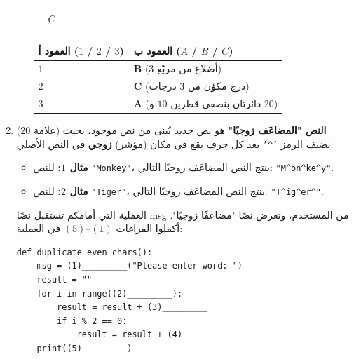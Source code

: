 \documentclass[14pt]{extarticle}
\begin{document}
\begin{enumerate}[resume, label=\textbf{السؤال \arabic*:}, wide=0pt, itemsep=2.2em]
\begin{enumerate}[label=\alph*.]
{\begin{longtable}{|C{0.9cm}|p{7.2cm}|C{0.9cm}|C{5.2cm}|}
\begin{pycell}
\begin{english}
\begin{verbatim}
\end{verbatim}
\end{english}
\end{pycell}
& $C$ &
\begin{english}
\vspace{0.1cm}
\end{english}
\\ \hline
\end{longtable}}

{\renewcommand{\arraystretch}{1.3}
\begin{longtable}{|C{4.5cm}|C{4.5cm}|}
\hline
\textbf{العمود أ ($1$ / $2$ / $3$)} & \textbf{العمود ب ($A$ / $B$ / $C$)} \\
\hline
$1$ & \ifwithsols $\mathbf{B}$ ($3$ أضلاع من مربّع) \fi \\ \hline
$2$ & \ifwithsols $\mathbf{C}$ (درج مكوّن من $3$ درجات) \fi \\ \hline
$3$ & \ifwithsols $\mathbf{A}$ (دائرتان بنصفي قطرين $10$ و $20$) \fi \\ \hline
\end{longtable}}
\filbreak
\end{enumerate}
\filbreak

\item ($20$ علامة) \textbf{النص "المضاعَف زوجيًا"} هو نص جديد يُبنى من نص موجود، بحيث نضيف الرمز \textenglish{\texttt{'\^{}'}} بعد كل حرف يقع في مكان (مؤشر) \textbf{زوجي} في النص الأصلي.
\begin{itemize}
\item \textbf{مثال $1$:} للنص \textenglish{\texttt{"Monkey"}}، ينتج النص المضاعَف زوجيًا التالي: \textenglish{\texttt{"M\^{}on\^{}ke\^{}y"}}.
\item \textbf{مثال $2$:} للنص \textenglish{\texttt{"Tiger"}}، ينتج النص المضاعَف زوجيًا التالي: \textenglish{\texttt{"T\^{}ig\^{}er\^{}"}}.
\end{itemize}
العملية التي أمامكم تستقبل نصًا \textenglish{msg} من المستخدم، وتعرض نصًا "مضاعفًا زوجيًا". أكملوا الفراغات $(1)$–$(5)$ في العملية:

\begin{boxCode}
\begin{english}
\begin{verbatim}
def duplicate_even_chars():
    msg = (1)_________("Please enter word: ")
    result = ""
    for i in range((2)_________):
        result = result + (3)_________
        if i % 2 == 0:
            result = result + (4)_________
    print((5)_________)
\end{verbatim}
\end{english}
\end{boxCode}


\end{enumerate}
\end{document}
